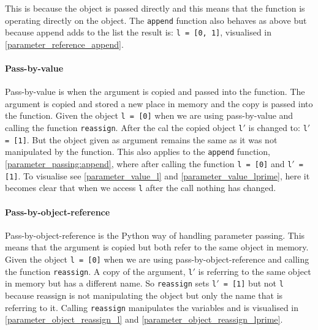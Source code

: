 This is because the object is passed directly and this means that the function is operating directly on the object.
The \texttt{append} function also behaves as above but because append adds to the list the result is: \texttt{l = [0, 1]}, visualised in \cref{parameter_reference_append}.


\paragraph{Pass-by-value}
Pass-by-value is when the argument is copied and passed into the function.
The argument is copied and stored a new place in memory and the copy is passed into the function.
Given the object \texttt{l = [0]} when we are using pass-by-value and calling the function \texttt{reassign}.
After the cal the copied object \texttt{l$'$} is changed to: \texttt{l$'$ = [1]}.
But the object given as argument remains the same as it was not manipulated by the function.
This also applies to the \texttt{append} function, \cref{parameter_passing:append}, where after calling the function \texttt{l = [0]} and \texttt{l$'$ = [1]}.
To visualise see \cref{parameter_value_l} and \cref{parameter_value_lprime}, here it becomes clear that when we access \texttt{l} after the call nothing has changed.


\paragraph{Pass-by-object-reference}
Pass-by-object-reference is the Python way of handling parameter passing.
This means that the argument is copied but both refer to the same object in memory.
Given the object \texttt{l = [0]} when we are using pass-by-object-reference and calling the function \texttt{reassign}.
A copy of the argument, \texttt{l$'$} is referring to the same object in memory but has a different name.
So \texttt{reassign} sets \texttt{l$'$ = [1]} but not \texttt{l} because reassign is not manipulating the object but only the name that is referring to it.
Calling \texttt{reassign} manipulates the variables and is visualised in \cref{parameter_object_reassign_l} and \cref{parameter_object_reassign_lprime}.

